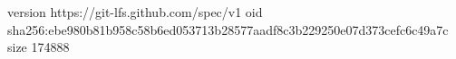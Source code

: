 version https://git-lfs.github.com/spec/v1
oid sha256:ebe980b81b958c58b6ed053713b28577aadf8c3b229250e07d373cefc6c49a7c
size 174888
